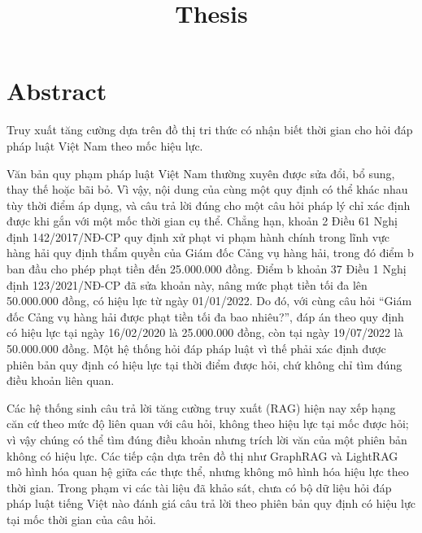 \documentclass[11pt,a4paper]{article}
\title{\textbf{Thesis}}
\author{}
\date{}
\begin{document}
\maketitle

\section{Abstract}
\begin{description}[leftmargin=0pt]
  \item[Title.] Truy xuất tăng cường dựa trên đồ thị tri thức có nhận biết thời gian cho hỏi đáp pháp luật Việt Nam theo mốc hiệu lực.

  \item[Context.] Văn bản quy phạm pháp luật Việt Nam thường xuyên được sửa đổi, bổ sung, thay thế hoặc bãi bỏ. Vì vậy, nội dung của cùng một quy định có thể khác nhau tùy thời điểm áp dụng, và câu trả lời đúng cho một câu hỏi pháp lý chỉ xác định được khi gắn với một mốc thời gian cụ thể. Chẳng hạn, khoản 2 Điều 61 Nghị định 142/2017/NĐ-CP quy định xử phạt vi phạm hành chính trong lĩnh vực hàng hải quy định thẩm quyền của Giám đốc Cảng vụ hàng hải, trong đó điểm b ban đầu cho phép phạt tiền đến 25.000.000 đồng. Điểm b khoản 37 Điều 1 Nghị định 123/2021/NĐ-CP đã sửa khoản này, nâng mức phạt tiền tối đa lên 50.000.000 đồng, có hiệu lực từ ngày 01/01/2022. Do đó, với cùng câu hỏi ``Giám đốc Cảng vụ hàng hải được phạt tiền tối đa bao nhiêu?'', đáp án theo quy định có hiệu lực tại ngày 16/02/2020 là 25.000.000 đồng, còn tại ngày 19/07/2022 là 50.000.000 đồng. Một hệ thống hỏi đáp pháp luật vì thế phải xác định được phiên bản quy định có hiệu lực tại thời điểm được hỏi, chứ không chỉ tìm đúng điều khoản liên quan.

  \item[Gap.] Các hệ thống sinh câu trả lời tăng cường truy xuất (RAG) hiện nay xếp hạng căn cứ theo mức độ liên quan với câu hỏi, không theo hiệu lực tại mốc được hỏi; vì vậy chúng có thể tìm đúng điều khoản nhưng trích lời văn của một phiên bản không có hiệu lực. Các tiếp cận dựa trên đồ thị như GraphRAG và LightRAG mô hình hóa quan hệ giữa các thực thể, nhưng không mô hình hóa hiệu lực theo thời gian. Trong phạm vi các tài liệu đã khảo sát, chưa có bộ dữ liệu hỏi đáp pháp luật tiếng Việt nào đánh giá câu trả lời theo phiên bản quy định có hiệu lực tại mốc thời gian của câu hỏi.


\end{description}
\end{document}
